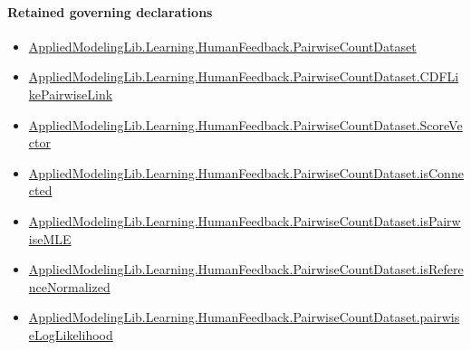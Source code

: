 \documentclass[10pt]{article}
\begin{document}
\paragraph{Retained governing declarations}
\begin{itemize}\raggedright
\item \hyperlink{governing-declaration-2ba23f394a8d08a2}{Applied\allowbreak{}Modeling\allowbreak{}Lib.\allowbreak{}Learning.\allowbreak{}Human\allowbreak{}Feedback.\allowbreak{}Pairwise\allowbreak{}Count\allowbreak{}Dataset}
\item \hyperlink{governing-declaration-3449f3559185d0fd}{Applied\allowbreak{}Modeling\allowbreak{}Lib.\allowbreak{}Learning.\allowbreak{}Human\allowbreak{}Feedback.\allowbreak{}Pairwise\allowbreak{}Count\allowbreak{}Dataset.\allowbreak{}CDF\allowbreak{}Like\allowbreak{}Pairwise\allowbreak{}Link}
\item \hyperlink{governing-declaration-87eda978eb1b0c9d}{Applied\allowbreak{}Modeling\allowbreak{}Lib.\allowbreak{}Learning.\allowbreak{}Human\allowbreak{}Feedback.\allowbreak{}Pairwise\allowbreak{}Count\allowbreak{}Dataset.\allowbreak{}Score\allowbreak{}Vector}
\item \hyperlink{governing-declaration-f509b3a8b33a7436}{Applied\allowbreak{}Modeling\allowbreak{}Lib.\allowbreak{}Learning.\allowbreak{}Human\allowbreak{}Feedback.\allowbreak{}Pairwise\allowbreak{}Count\allowbreak{}Dataset.\allowbreak{}is\allowbreak{}Connected}
\item \hyperlink{governing-declaration-cba21d23e0e5aa10}{Applied\allowbreak{}Modeling\allowbreak{}Lib.\allowbreak{}Learning.\allowbreak{}Human\allowbreak{}Feedback.\allowbreak{}Pairwise\allowbreak{}Count\allowbreak{}Dataset.\allowbreak{}is\allowbreak{}Pairwise\allowbreak{}MLE}
\item \hyperlink{governing-declaration-183c779b24cebcca}{Applied\allowbreak{}Modeling\allowbreak{}Lib.\allowbreak{}Learning.\allowbreak{}Human\allowbreak{}Feedback.\allowbreak{}Pairwise\allowbreak{}Count\allowbreak{}Dataset.\allowbreak{}is\allowbreak{}Reference\allowbreak{}Normalized}
\item \hyperlink{governing-declaration-10adb9e7c1ff9f4c}{Applied\allowbreak{}Modeling\allowbreak{}Lib.\allowbreak{}Learning.\allowbreak{}Human\allowbreak{}Feedback.\allowbreak{}Pairwise\allowbreak{}Count\allowbreak{}Dataset.\allowbreak{}pairwise\allowbreak{}Log\allowbreak{}Likelihood}
\end{itemize}
\end{document}
